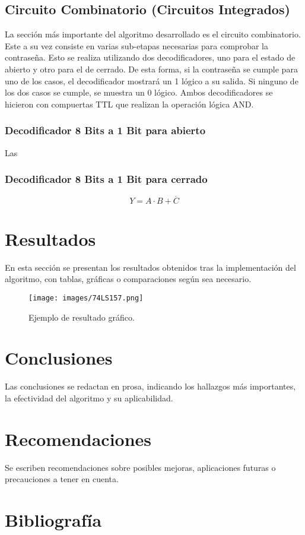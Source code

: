 \documentclass[conference]{IEEEtran}  %
\begin{document}
\subsection{Circuito Combinatorio (Circuitos Integrados)}

La sección más importante del algoritmo desarrollado es el circuito combinatorio. Este a su vez consiste en varias sub-etapas necesarias para comprobar la contraseña. Esto se realiza utilizando dos decodificadores, uno para el estado de abierto y otro para el de cerrado. De esta forma, si la contraseña se cumple para uno de los casos, el decodificador mostrará un 1 lógico a su salida. Si ninguno de los dos casos se cumple, se muestra un 0 lógico. Ambos decodificadores se hicieron con compuertas TTL que realizan la operación lógica AND. 

\subsubsection{Decodificador 8 Bits a 1 Bit para abierto}

Las 

\subsubsection{Decodificador 8 Bits a 1 Bit para cerrado}


\begin{equation}
Y = A \cdot B + \overline{C}
\end{equation}

\section{Resultados}
En esta sección se presentan los resultados obtenidos tras la implementación del algoritmo, con tablas, gráficas o comparaciones según sea necesario.  
\begin{figure}[h]
    \centering
    \texttt{[image: images/74LS157.png]}
    \caption{Ejemplo de resultado gráfico.}
    \label{fig:resultados}
\end{figure}

\section{Conclusiones}
Las conclusiones se redactan en prosa, indicando los hallazgos más importantes, la efectividad del algoritmo y su aplicabilidad.

\section{Recomendaciones}
Se escriben recomendaciones sobre posibles mejoras, aplicaciones futuras o precauciones a tener en cuenta.

\section*{Bibliografía}

\end{document}

